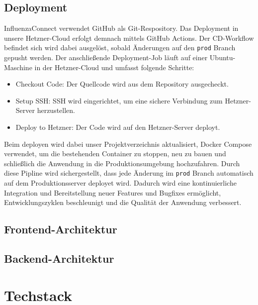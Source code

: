 \documentclass[conference,a4paper,flushend]{cs-techrep}
\begin{document}
\subsection{Deployment}
InfluenzaConnect verwendet GitHub als Git-Respository. Das Deployment in unsere Hetzner-Cloud erfolgt demnach mittels GitHub Actions. Der CD-Workflow befindet sich wird dabei ausgelöst, sobald Änderungen auf den \texttt{prod} Branch gepusht werden. Der anschließende Deployment-Job läuft auf einer Ubuntu-Maschine in der Hetzner-Cloud und umfasst folgende Schritte:
\begin{itemize}
\item{Checkout Code: Der Quellcode wird aus dem Repository ausgecheckt.}
\item{Setup SSH: SSH wird eingerichtet, um eine sichere Verbindung zum Hetzner-Server
herzustellen.}
\item{Deploy to Hetzner: Der Code wird auf den Hetzner-Server deployt.}
\end{itemize}
Beim deployen wird dabei unser Projektverzeichnis aktualisiert, Docker Compose verwendet, um die bestehenden Container zu stoppen, neu zu bauen und schließlich die Anwendung in die Produktionsumgebung hochzufahren.
Durch diese Pipline wird sichergestellt, dass jede Änderung im \texttt{prod} Branch automatisch auf dem Produktionsserver deployet wird. Dadurch wird eine kontinuierliche Integration und Bereitstellung neuer Features und Bugfixes ermöglicht, Entwicklungszyklen beschleunigt und die Qualität der Anwendung verbessert.

\subsection{Frontend-Architektur}


\subsection{Backend-Architektur}

\section{Techstack}
\end{document}
